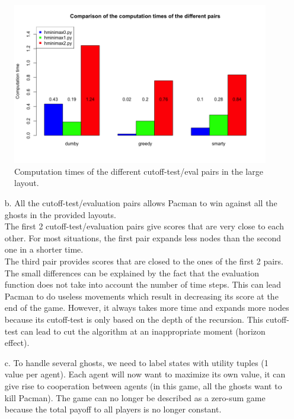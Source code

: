 \documentclass{article}
\begin{document}
		\begin{figure}[H]
			\centering
			\includegraphics[scale=0.45]{plots/3a_times.png} 
			\caption{Computation times of the different cutoff-test/eval pairs in the large layout.}
		\end{figure}
\begin{enumerate}[label=\alph*.,leftmargin=*]	
	\item[b.] All the cutoff-test/evaluation pairs allows Pacman to win against all the ghosts in the provided layouts.\\ The first 2 cutoff-test/evaluation pairs give scores that are very close to each other. For most situations, the first pair expands less nodes than the second one in a shorter time.\\
	The third pair provides scores that are closed to the ones of the first 2 pairs. The small differences can be explained by the fact that the evaluation function does not take into account the number of time steps. This can lead Pacman to do useless movements which result in decreasing its score at the end of the game. However, it always takes more time and expands more nodes because its cutoff-test is only based on the depth of the recursion. This cutoff-test can lead to cut the algorithm at an inappropriate moment (horizon effect).

    \item[c.] To handle several ghosts, we need to label states with utility tuples (1 value per agent). Each agent will now want to maximize its own value, it can give rise to cooperation between agents (in this game, all the ghosts want to kill Pacman). The game can no longer be described as a zero-sum game because the total payoff to all players is no longer constant.

\end{enumerate}

\end{document}
